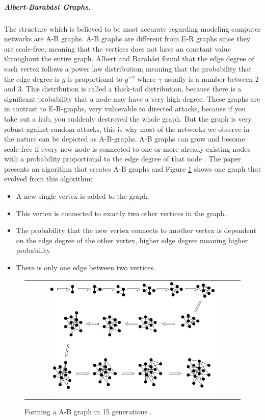 \subparagraph{\label{ABgraph}Albert-Barabási Graphs.}
The structure which is believed to be most accurate regarding modeling computer networks are A-B graphs. A-B graphs are different from E-R graphs since they are scale-free, meaning that the vertices does not have an constant value throughout the entire graph. Albert and Barabási found that the edge degree of each vertex follows a power law distribution; meaning that the probability that the edge degree is $g$ is proportional to $g^{-\gamma}$
where $\gamma$ usually is a number between 2 and 3. This distribution is called a thick-tail distribution, because there is a significant probability that a node may have a very high degree. \cite{audestad}
These graphs are in contrast to E-R-graphs, very vulnerable to directed attacks, because if you take out a hub, you suddenly destroyed the whole graph. But the graph is very robust against random attacks, this is why most of the networks we observe in the nature can be depicted as A-B-graphs.
A-B graphs can grow and become scale-free if every new node is connected to one or more already existing nodes with a probability proportional to the edge degree of that node . The paper presents an algorithm that creates A-B graphs and Figure \ref{fig:ABgraphcreation} shows one graph that evolved from this algorithm:

\begin{itemize}
\item A new single vertex is added to the graph.
\item This vertex is connected to exactly two other vertices in the graph.
\item The probability that the new vertex connects to another vertex is dependent on the edge degree of the other vertex, higher edge degree meaning higher probability
\item There is only one edge between two vertices.
\end{itemize}


\begin{figure}[h]
\centering
\begin{tabular}{@{}c@{}}
\includegraphics[width=0.8\textwidth]{../Figures/ABgraphcreation.png}
\end{tabular}
\caption{\label{fig:ABgraphcreation} Forming a A-B graph in 15 generations \cite{audestad}.}
\end{figure}

